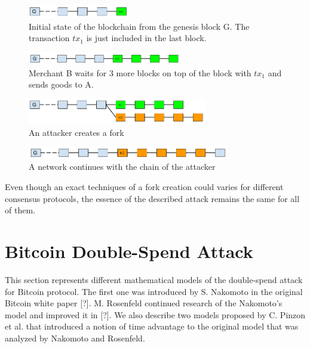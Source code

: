 \documentclass[10pt,a4paper]{article}
\numberwithin{equation}{section} %
\theoremstyle{plain}
\theoremstyle{definition}
\theoremstyle{remark}
\begin{document}
    \begin{figure}[h]
            \centering
            \includegraphics[width=0.4\textwidth]{Fig1}
            \caption{Initial state of the blockchain from the genesis block G. The transaction \(tx_1\) is just included in the last block.}
            \label{fig:Fig1}
    \end{figure}
    \begin{figure}[h]
            \centering
            \includegraphics[width=0.6\textwidth]{Fig2}
            \caption{Merchant B waits for 3 more blocks on top of the block with \(tx_1\) and sends goods to A.}
            \label{fig:Fig2}
    \end{figure}
    \begin{figure}[h]
            \centering
            \includegraphics[width=0.7\textwidth]{Fig3}
            \caption{An attacker creates a fork}
            \label{fig:Fig3}
    \end{figure}
    \begin{figure}[h]
            \centering
            \includegraphics[width=0.78\textwidth]{Fig4}
            \caption{A network continues with the chain of the attacker}
            \label{fig:Fig4}
    \end{figure}
    
    Even though an exact techniques of a fork creation could varies for different consensus protocols, the essence of the described attack remains the same for all of them. 
	
	\section{Bitcoin Double-Spend Attack}
	
	This section represents different mathematical models of the double-spend attack for Bitcoin protocol. The first one was introduced by S. Nakomoto in the original Bitcoin white paper [?]. M. Rosenfeld continued research of the Nakomoto's model and improved it in [?]. We also describe two models proposed by C. Pinzon et al. that introduced a notion of time advantage to the original model that was analyzed by Nakomoto and Rosenfeld.
	
\end{document}
